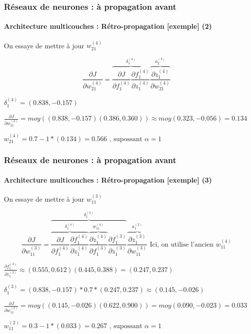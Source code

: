 \documentclass[xcolor=table]{beamer}
\begin{document}
\begin{frame}
\frametitle{Réseaux de neurones : à propagation avant}
\framesubtitle{Architecture multicouches : Rétro-propagation [exemple] (2)}

On essaye de mettre à jour $w_{21}^{(4)}$

\small

\[
\frac{\partial J}{\partial w_{21}^{(4)}} = \overbrace{\frac{\partial J}{\partial f_{1}^{(4)}} \frac{\partial f_{1}^{(4)}}{\partial z_{1}^{(4)}}}^{\delta_{1}^{(4)}} \overbrace{\frac{\partial z_{1}^{(4)}}{\partial w_{21}^{(4)}}}^{a_{2}^{(3)}}
\]


$
\delta_{1}^{(4)} = (0.838, -0.157)
$

$
\frac{\partial J}{\partial w_{21}^{(4)}} = moy((0.838, -0.157) (0.386, 0.360)) 
\approx moy(0.323, -0.056) = 0.134
$

$
w_{21}^{(4)} = 0.7 - 1 * (0.134) = 0.566 \text{ , supossant } \alpha = 1
$

\end{frame}

\begin{frame}
\frametitle{Réseaux de neurones : à propagation avant}
\framesubtitle{Architecture multicouches : Rétro-propagation [exemple] (3)}

On essaye de mettre à jour $w_{11}^{(3)}$

\small

\[
\frac{\partial J}{\partial w_{11}^{(3)}} = 
\overbrace{
	\overbrace{
		\frac{\partial J}{\partial f_{1}^{(4)}} 
		\frac{\partial f_{1}^{(4)}}{\partial z_{1}^{(4)}}
	}^{\delta_{1}^{(4)}} 
	\overbrace{
		\frac{\partial z_{1}^{(4)}}{\partial f_{1}^{(3)}}
	}^{w_{11}^{(4)}} 
	\frac{\partial f_{1}^{(3)}}{\partial z_{1}^{(3)}} 
}^{\delta_{1}^{(3)}} 
\overbrace{
	\frac{\partial z_{1}^{(3)}}{\partial w_{11}^{(3)}}
}^{a_{1}^{(2)}}
\text{ Ici, on utilise l'ancien } w_{11}^{(4)}
\]

$
\frac{\partial f_{1}^{(3)}}{\partial z_{1}^{(3)}} \approx 
(0.555, 0.612) (0.445, 0.388) = (0.247, 0.237)
$

$
\delta_{1}^{(3)} = (0.838, -0.157) * 0.7 * (0.247, 0.237) \approx (0.145, -0.026)
$

$
\frac{\partial J}{\partial w_{11}^{(2)}} = moy((0.145, -0.026) (0.622, 0.900)) 
= moy(0.090, -0.023) = 0.033
$

$
w_{11}^{(2)} = 0.3 - 1 * (0.033) = 0.267 \text{ , supossant } \alpha = 1
$

\end{frame}
\end{document}
